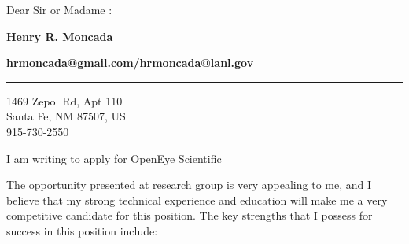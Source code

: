 \documentclass[11pt]{letter}
\begin{document}
\signature{Henry R. Moncada}           %
\longindentation=0pt                       %
\let\raggedleft\raggedright                %
\begin{letter}{Dear Sir or Madame :}
    \begin{minipage}{.35\linewidth}
    \begin{flushleft}
{\large\bf Henry R. Moncada}
    \end{flushleft}
  \end{minipage}
  \hfill
  \begin{minipage}{.55\linewidth}
    \begin{flushright}
{\large\bf hrmoncada@gmail.com/hrmoncada@lanl.gov}
    \end{flushright} 
  \end{minipage}
\medskip\hrule height .3pt
\begin{flushright}
\hfill 1469 Zepol Rd, Apt 110\\
\hfill Santa Fe, NM 87507, US\\
\hfill 915-730-2550
\end{flushright} 

\opening{}
I am writing to apply for OpenEye Scientific


The opportunity presented at research group is very appealing to me, and I believe that my strong technical experience and education will make me a very competitive candidate for this position.
The key strengths that I possess for success in this position include:
\begin{itemize}
 

\end{itemize}
\end{letter}
\end{document}
